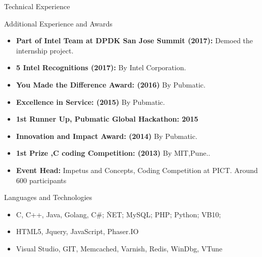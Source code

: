 \documentclass[]{mcdowellcv}
\begin{document}
\begin{cvsection}{Technical Experience}
	\end{cvsection}
	
	\begin{cvsection}{Additional Experience and Awards}
		\begin{cvsubsection}{}{}{}	
			\begin{itemize}
				\item \textbf{Part of Intel Team at DPDK San Jose Summit (2017):} Demoed the internship project.
				\item \textbf{5 Intel Recognitions (2017):} By Intel Corporation.
				\item \textbf{You Made the Difference Award: (2016)} By Pubmatic.
				\item \textbf{Excellence in Service: (2015)} By Pubmatic.
				\item \textbf{1st Runner Up, Pubmatic Global Hackathon: 2015}
				\item \textbf{Innovation and Impact Award: (2014) } By Pubmatic.
				\item \textbf{1st Prize ,C coding Competition: (2013)} By MIT,Pune..
				\item \textbf{Event Head:} Impetus and Concepts, Coding Competition at PICT. Around 600 participants
			\end{itemize}
		\end{cvsubsection}
	\end{cvsection}
	
	\begin{cvsection}{Languages and Technologies}
		\begin{cvsubsection}{}{}{}	
			\begin{itemize}
				\item  C, C++, Java, Golang, C\#; \.NET; MySQL; PHP; Python; VB10; 
				\item HTML5, Jquery, JavaScript, Phaser.IO
				\item Visual Studio, GIT, Memcached, Varnish, Redis, WinDbg, VTune
			\end{itemize}
		\end{cvsubsection}
	\end{cvsection}
	
\end{document}
